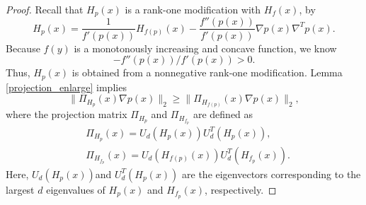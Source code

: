 \documentclass[aos,preprint]{imsart}
\theoremstyle{remark}
\begin{document}
\begin{appendix}
\begin{proof}\label{monotonously theorem proof}
Recall that $H_p(x)$ is a rank-one modification with $H_{f}(x)$, by 
\begin{equation}\label{rankone}
 H_{p}(x) =\frac{1}{ f'(p(x))} H_{f(p)}(x) - \frac{f''(p(x))}{ f'(p(x))} \nabla p(x) \nabla^T p(x) .
\end{equation}
 Because $f(y)$ is a monotonously increasing and concave function, we know 
\[
- f''(p(x))/f'(p(x))>0.
\] 
Thus, $H_{p}(x)$ is obtained from a nonnegative rank-one modification. Lemma \ref{projection_enlarge} implies
\begin{equation}\label{enlargement}
\|\Pi_{H_p}(x)\nabla p(x)\|_2 \geq \|\Pi_{H_{f(p)}}(x)\nabla p(x)\|_2,
\end{equation}
where the projection matrix $\Pi_{H_p}$ and $\Pi_{H_{f_p}} $ are defined as
\[
\begin{aligned}
&\Pi_{H_p}(x)= U_d(H_p(x))U^T_d(H_p(x)), \\
&\Pi_{H_{f_p}}(x) = U_d(H_{f(p)}(x))U^T_d(H_{f_p}(x)).
\end{aligned}
\]
Here, $U_d(H_p(x))$and $U^T_d(H_p(x))$ are the eigenvectors corresponding to the largest $d$ eigenvalues of $H_p(x)$ and $H_{f_p}(x)$, respectively.


\end{proof}
\end{appendix}
\end{document}
